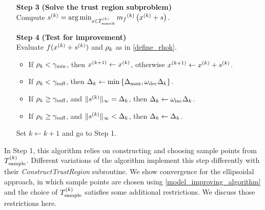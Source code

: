 \begin{algorithm}[H]
\begin{itemize}
        
        \item[\textbf{Step 3}] \textbf{(Solve the trust region subproblem)} \\
            Compute ${{s}^{(k)}} = \operatorname*{arg\,min}_{s \in {T_{\text{search}}^{(k)}}} {{m}_f}^{(k)}\left(x^{(k)} + s\right)$. 
            
 		\end{itemize}
 		\end{algorithm}
 		
 		\newpage
 		
 		\begin{algorithm}[H]
 		\begin{itemize}
        \item[\textbf{Step 4}] \textbf{(Test for improvement)} \\
            Evaluate $f(x^{(k)} + {{s}^{(k)}})$ and $\rho_k$ as in \cref{define_rhok}.
            \begin{itemize}
            	\item If $\rho_k < \gamma_{\textrm{min}}$, then ${{x}^{(k+1)}} \gets x^{(k)}$, otherwise ${{x}^{(k+1)}} \gets x^{(k)} + {{s}^{(k)}}$.
            	\item If $\rho_k < \gamma_{\textrm{suff}}$, then $\Delta_k \gets \min\left\{{\Delta_{\textrm{max}}}, \omega_{\text{dec}}\Delta_k\right\}$.
            	\item If $\rho_k \ge \gamma_{\textrm{suff}}$, and $\|{{s}^{(k)}}\|_{\infty} = \Delta_k$, then $\Delta_k \gets \omega_{\text{inc}}\Delta_k$.
            	\item If $\rho_k \ge \gamma_{\textrm{suff}}$, and $\|{{s}^{(k)}}\|_{\infty} < \Delta_k$, then $\Delta_k \gets \Delta_k$.
            \end{itemize}
            Set $k \gets k+1$ and go to Step 1.
    \end{itemize}
\end{algorithm}

In Step 1, this algorithm relies on constructing and choosing sample points from ${T_{\text{sample}}^{(k)}}$.
Different variations of the algorithm implement this step differently with their \emph{ConstructTrustRegion} subroutine.
We show convergence for the ellipsoidal approach, in which sample points are chosen using \cref{model_improving_algorithm}
and the choice of ${T_{\text{sample}}^{(k)}}$ satisfies some additional restrictions.
We discuss those restrictions here.

